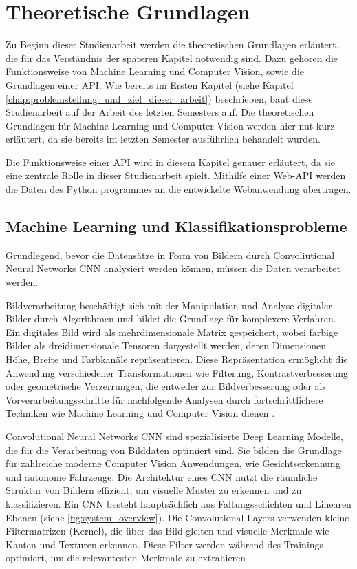 \chapter{Theoretische Grundlagen} \label{chap:theoretische_grundlagen}  %
Zu Beginn dieser Studienarbeit werden die theoretischen Grundlagen erläutert, die für das Verständnis der späteren Kapitel notwendig sind. Dazu gehören die Funktionsweise von Machine Learning und Computer Vision, sowie die Grundlagen einer API.
Wie bereits im Ersten Kapitel (siehe Kapitel \ref{chap:problemstellung_und_ziel_dieser_arbeit}) beschrieben, baut diese Studienarbeit auf der Arbeit des letzten Semesters auf. 
Die theoretischen Grundlagen für Machine Learning und Computer Vision werden hier nut kurz erläutert, da sie bereits im letzten Semester ausführlich behandelt wurden.

Die Funktionsweise einer API wird in diesem Kapitel genauer erläutert, da sie eine zentrale Rolle in dieser Studienarbeit spielt. Mithilfe einer Web-API werden die Daten
des Python programmes an die entwickelte Webanwendung übertragen.

\section{Machine Learning und Klassifikationsprobleme} \label{sec:ml_cv}  %
Grundlegend, bevor die Datensätze in Form von Bildern durch Convoliutional Neural Networks \ac{CNN} analysiert werden können, müssen die Daten verarbeitet werden.

Bildverarbeitung beschäftigt sich mit der Manipulation und Analyse digitaler Bilder durch Algorithmen und bildet die Grundlage für komplexere Verfahren. 
Ein digitales Bild wird als mehrdimensionale Matrix gespeichert, wobei farbige Bilder als dreidimensionale Tensoren 
dargestellt werden, deren Dimensionen Höhe, Breite und Farbkanäle repräsentieren. 
Diese Repräsentation ermöglicht die Anwendung verschiedener Transformationen wie Filterung, Kontrastverbesserung oder geometrische Verzerrungen, die 
entweder zur Bildverbesserung oder als Vorverarbeitungsschritte für nachfolgende Analysen durch fortschrittlichere Techniken wie Machine Learning und Computer Vision dienen \cite{finbridgede_computer_2022}.

Convolutional Neural Networks \ac{CNN} sind spezialisierte Deep Learning Modelle, die für die Verarbeitung von Bilddaten optimiert sind. Sie bilden die Grundlage für zahlreiche moderne Computer Vision Anwendungen, wie Gesichtserkennung und autonome Fahrzeuge. 
Die Architektur eines CNN nutzt die räumliche Struktur von Bildern effizient, um visuelle Muster zu erkennen und zu klassifizieren.
Ein CNN besteht hauptsächlich aus Faltungsschichten und Linearen Ebenen (siehe \autoref{fig:system_overview}). 
Die Convolutional Layers verwenden kleine Filtermatrizen (Kernel), die über das Bild gleiten und visuelle Merkmale wie Kanten und Texturen erkennen. 
Diese Filter werden während des Trainings optimiert, um die relevantesten Merkmale zu extrahieren \cite{finbridgede_computer_2022} \cite{erfassung_convolutional_nodate}.


